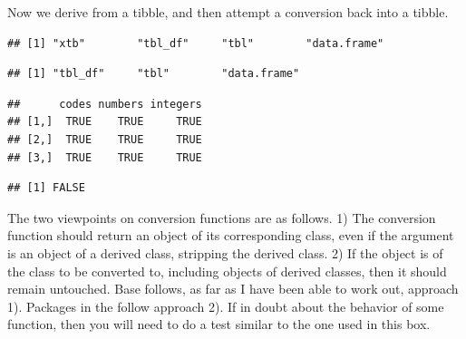 \documentclass[krantz2]{krantz}\usepackage{knitr}
\begin{document}
\begin{explainbox}
Now we derive from a tibble, and then attempt a conversion back into a tibble.

\begin{knitrout}\footnotesize
{}\color{fgcolor}\begin{kframe}
\begin{alltt}
 \hlkwb{<-} 
 \hlkwb{<-} \hlstd{(}\hlstd{,} 
\end{alltt}
\begin{verbatim}
## [1] "xtb"        "tbl_df"     "tbl"        "data.frame"
\end{verbatim}
\begin{alltt}
 \hlkwb{<-} 
\end{alltt}
\begin{verbatim}
## [1] "tbl_df"     "tbl"        "data.frame"
\end{verbatim}
\begin{alltt}
 \hlopt{==} 
\end{alltt}
\begin{verbatim}
##      codes numbers integers
## [1,]  TRUE    TRUE     TRUE
## [2,]  TRUE    TRUE     TRUE
## [3,]  TRUE    TRUE     TRUE
\end{verbatim}
\begin{alltt}
\end{alltt}
\begin{verbatim}
## [1] FALSE
\end{verbatim}
\end{kframe}
\end{knitrout}

The two viewpoints on conversion functions are as follows. 1) The conversion function should return an object of its corresponding class, even if the argument is an object of a derived class, stripping the derived class. 2) If the object is of the class to be converted to, including objects of derived classes, then it should remain untouched. Base \Rlang follows, as far as I have been able to work out, approach 1). Packages in the  follow approach 2). If in doubt about the behavior of some function, then you will need to do a test similar to the one used in this box.
\end{explainbox}
\end{document}
